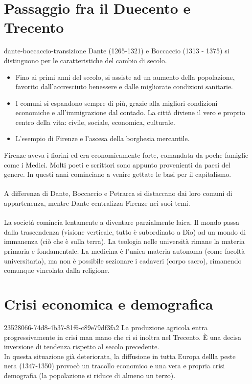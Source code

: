 \documentclass[preview]{standalone}
\begin{document}
\genpage

\section{Passaggio fra il Duecento e Trecento}

\begin{snippet}{dante-boccaccio-transizione}
    Dante (1265-1321) e Boccaccio (1313 - 1375)
    si distinguono per le caratteristiche del cambio di secolo.
    
    \begin{itemize}
        \item Fino ai primi anni del secolo, si assiste ad un aumento della popolazione, favorito dall'accresciuto benessere e dalle migliorate condizioni sanitarie.
        \item I comuni si espandono sempre di più, grazie alla migliori condizioni economiche e all'immigrazione dal contado. La città diviene il vero e proprio centro della vita: civile, sociale, economica, culturale.
        \item L'esempio di Firenze e l'ascesa della borghesia mercantile.
    \end{itemize}
    
    Firenze aveva i fiorini ed era economicamente forte, comandata da poche famiglie come i Medici.
    Molti poeti e scrittori sono appunto provenienti da paesi del genere.
    In questi anni cominciano a venire gettate le basi per il capitalismo.
    \\\\
    A differenza di Dante, Boccaccio e Petrarca si distaccano dai loro comuni di appartenenza,
    mentre Dante centralizza Firenze nei suoi temi.
    \\\\
    La società comincia lentamente a diventare parzialmente laica.
    Il mondo passa dalla trascendenza (visione verticale, tutto è subordinato a Dio)
    ad un mondo di immanenza (ciò che è sulla terra).
    La teologia nelle università rimane la materia primaria e fondamentale.
    La medicina è l'unica materia autonoma (come facoltà universitaria), ma non è possibile sezionare i cadaveri (corpo sacro),
    rimanendo comunque vincolata dalla religione.
\end{snippet}

\section{Crisi economica e demografica}

\begin{snippet}{23528066-74d8-4b37-81f6-c89e79df3fa2}
    La produzione agricola entra progressivamente in crisi man mano che ci si inoltra nel Trecento.
    È una decisa inversione di tendenza rispetto al secolo precedente.\\
    In questa situazione già deteriorata, la diffusione in tutta Europa dellla peste nera (1347-1350) provocò
    un tracollo economico e una vera e propria crisi demografia (la popolazione si riduce di almeno un terzo).
\end{snippet}
\end{document}
